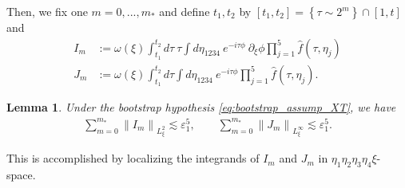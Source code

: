 \documentclass[reqno,english,11pt]{amsart}
\newcommand{\eps}{\varepsilon}
\newcommand{\snorm}[1]{\left\|#1\right\|}
\newtheorem{lemma}[theorem]{Lemma}
\theoremstyle{definition}
\numberwithin{equation}{section}
\begin{document}
Then, we fix one $m=0,...,m_{*}$ and define $t_1, t_2$ by $[t_1, t_2] = \left\{\tau \sim 2^{m}\right\}\cap [1,t]$ and
\begin{subequations}
\begin{align}
\label{eq:I_dfn}
I_{m} &:= \omega(\xi)
    \int_{t_1}^{t_2}  d \tau \ \tau \int d\eta_{1234}\ e^{-i\tau\phi}\  \partial_{\xi}\phi \prod^5_{j=1} \hat{f}(\tau,\eta_{j})
    \\ \label{eq:J_dfn}
    J_{m} &:=\omega(\xi)\int_{t_1}^{t_2} d \tau \int d\eta_{1234}\ e^{-i\tau\phi} \prod^5_{j=1}  \hat{f}\left(\tau,\eta_j\right).
\end{align}
\end{subequations}
\begin{lemma}\label{lem:dyadicLJ}
 Under the bootstrap hypothesis \eqref{eq:bootstrap_assump_XT}, we have
\begin{subequations}
    \begin{align}
        \label{eqn:claimed_bound}
\sum_{m=0}^{m_{*}}\snorm{I_{m} }_{L^2_{\xi}} \lesssim \eps_1^5,\qquad
\sum_{m=0}^{m_{*}}\snorm{J_{m} }_{L^\infty_{\xi}} \lesssim \eps_1^5 . 
    \end{align}
\end{subequations}
\end{lemma}

This is accomplished by localizing the integrands of $I_{m}$ and $J_m$ in $\eta_1\eta_2\eta_3\eta_4\xi$-space.
\end{document}
